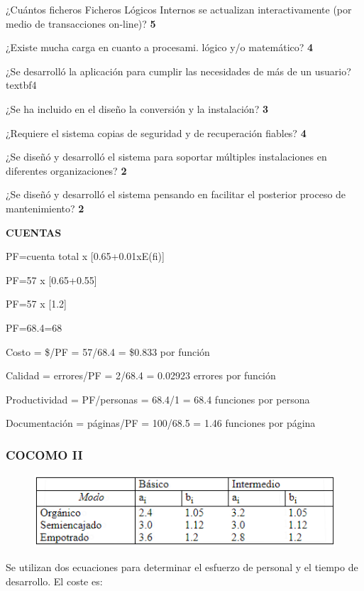 \documentclass[10pt]{article}
\begin{document}
¿Cuántos ficheros Ficheros Lógicos Internos se actualizan interactivamente (por medio de transacciones on-line)? \textbf{5}

¿Existe mucha carga en cuanto a procesami. lógico y/o matemático?  \textbf{4}

¿Se desarrolló la aplicación para cumplir las necesidades de más de un usuario?  textbf{4}

¿Se ha incluido en el diseño la conversión y la instalación?  \textbf{3}

¿Requiere el sistema copias de seguridad y de recuperación fiables?  \textbf{4}

¿Se diseñó y desarrolló el sistema para soportar múltiples instalaciones en diferentes organizaciones? \textbf{2} 

¿Se diseñó y desarrolló el sistema pensando en facilitar el posterior proceso de mantenimiento? \textbf{2}

\newpage
\textbf{CUENTAS}

PF=cuenta total x [0.65+0.01xE(fi)]

PF=57 x [0.65+0.55]

PF=57 x [1.2]

PF=68.4=68

Costo = \$/PF = 57/68.4 = \$0.833 por función

Calidad = errores/PF = 2/68.4 = 0.02923 errores por función

Productividad = PF/personas = 68.4/1 = 68.4 funciones por 
persona

Documentación = páginas/PF = 100/68.5 = 1.46 funciones por página

\subsubsection{COCOMO II}

\begin{figure}[H]
	\begin{center}
\includegraphics{Imagenes/COCOMO.PNG}
	\end{center} 
\end{figure}
Se utilizan dos ecuaciones para determinar el esfuerzo de personal y el tiempo de desarrollo. El coste es:
\end{document}
